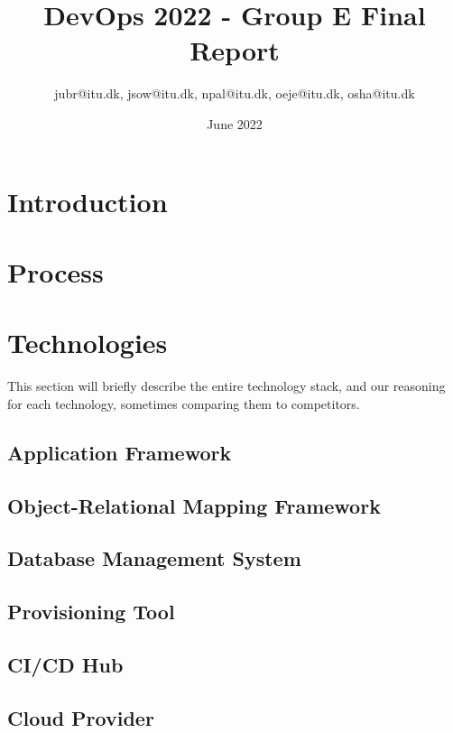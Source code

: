 \documentclass{article}
\title{DevOps 2022 - Group E Final Report}
\author{jubr@itu.dk, jsow@itu.dk, npal@itu.dk, oeje@itu.dk, osha@itu.dk}
\date{June 2022}
\begin{document}
\maketitle

\newpage
\tableofcontents
\newpage

\section{Introduction}


\section{Process}


\section{Technologies}
This section will briefly describe the entire technology stack, and our reasoning for each technology, sometimes comparing them to competitors.

\subsection{Application Framework}


\subsection{Object-Relational Mapping Framework}


\subsection{Database Management System}


\subsection{Provisioning Tool}


\subsection{CI/CD Hub} \label{ci_cd_hub}




\subsection{Cloud Provider} \label{digitalocean}

\end{document}

